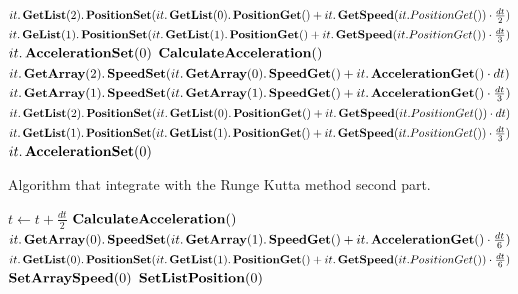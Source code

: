 \begin{algorithm}
\begin{algorithmic}[1]
       \EndFor
            \State $it.\mathop{\textbf{GetList}}(2).\mathop{\textbf{PositionSet}}(it.\mathop{\textbf{GetList}}(0).\mathop{\textbf{PositionGet}}()+it.\mathop{\textbf{GetSpeed}}(it.PositionGet())\cdot \frac{dt}{2})$
            \State $it.\mathop{\textbf{GeList}}(1).\mathop{\textbf{PositionSet}}(it.\mathop{\textbf{GetList}}(1).\mathop{\textbf{PositionGet}}()+it.\mathop{\textbf{GetSpeed}}(it.PositionGet())\cdot \frac{dt}{3})$
       \EndFor
            \State $it.\mathop{\textbf{AccelerationSet}}(0)$
        \EndFor
        \State $\mathop{\textbf{CalculateAcceleration}}()$
            \State $it.\mathop{\textbf{GetArray}}(2).\mathop{\textbf{SpeedSet}}(it.\mathop{\textbf{GetArray}}(0).\mathop{\textbf{SpeedGet}}()+it.\mathop{\textbf{AccelerationGet}}()\cdot dt)$
            \State $it.\mathop{\textbf{GetArray}}(1).\mathop{\textbf{SpeedSet}}(it.\mathop{\textbf{GetArray}}(1).\mathop{\textbf{SpeedGet}}()+it.\mathop{\textbf{AccelerationGet}}()\cdot \frac{dt}{3})$
        \EndFor
            \State $it.\mathop{\textbf{GetList}}(2).\mathop{\textbf{PositionSet}}(it.\mathop{\textbf{GetList}}(0).\mathop{\textbf{PositionGet}}()+it.\mathop{\textbf{GetSpeed}}(it.PositionGet())\cdot dt)$
            \State $it.\mathop{\textbf{GetList}}(1).\mathop{\textbf{PositionSet}}(it.\mathop{\textbf{GetList}}(1).\mathop{\textbf{PositionGet}}()+it.\mathop{\textbf{GetSpeed}}(it.PositionGet())\cdot \frac{dt}{3})$
        \EndFor
            \State $it.\mathop{\textbf{AccelerationSet}}(0)$
        \EndFor
             \end{algorithmic}
\end{algorithm}
\begin{algorithm}
\caption{Algorithm that integrate with the Runge Kutta method second part.}
\label{code:RungeKutta2p2}
\begin{algorithmic}[1]
        \State $t\gets t+\frac{dt}{2}$
        \State $\mathop{\textbf{CalculateAcceleration}}()$
            \State $it.\mathop{\textbf{GetArray}}(0).\mathop{\textbf{SpeedSet}}(it.\mathop{\textbf{GetArray}}(1).\mathop{\textbf{SpeedGet}}()+it.\mathop{\textbf{AccelerationGet}}()\cdot \frac{dt}{6})$
         \EndFor
            \State $it.\mathop{\textbf{GetList}}(0).\mathop{\textbf{PositionSet}}(it.\mathop{\textbf{GetList}}(1).\mathop{\textbf{PositionGet}}()+it.\mathop{\textbf{GetSpeed}}(it.PositionGet())\cdot \frac{dt}{6})$
         \EndFor
        \State $\mathop{\textbf{SetArraySpeed}}(0)$
        \State $\mathop{\textbf{SetListPosition}}(0)$
        \EndProcedure
        \end{algorithmic}
\end{algorithm}

